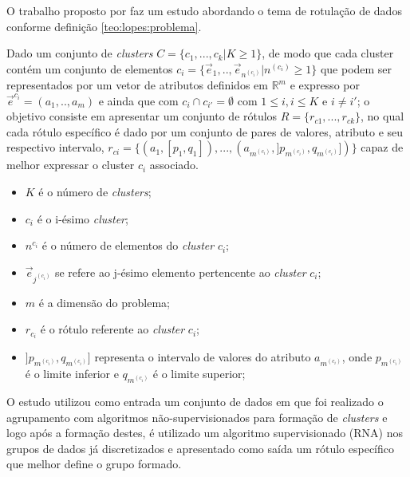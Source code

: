 O trabalho proposto por  faz um estudo abordando o tema de rotulação de dados conforme definição  \ref{teo:lopes:problema}.
% 
    \begin{teorema}
Dado um conjunto de \textit{clusters} ${C=\{c_1,...,c_k | K \geqslant 1\} }$, de modo que cada cluster contém um conjunto de elementos ${c_i=\{\vec{e}_1,..,\vec{e}_{n^{(c_i)}}|n^{(c_i)} \geqslant 1 \}}$ que podem ser representados por um vetor de atributos definidos em ${\mathbb{R}^m }$ e expresso por ${ \vec{e}^{c_i}=(a_1,..,a_m)  }$ e ainda que  com ${ c_i \cap c_{i'}=\emptyset }$ com ${ 1 \leqslant i, i \leqslant K  }$ e ${ i \neq i' }$; o objetivo consiste em apresentar um conjunto de rótulos ${ R=\{ r_{c1},...,r_{ck} \} }$, no qual cada rótulo específico é dado por um conjunto de pares de valores, atributo e seu respectivo intervalo, ${ r_{ci}=\{ (a_1,[p_1,q_1]),...,(a_{m^{(c_i)}}, ]p_{m^{(c_i)}},q_{m^{(c_i)}}]) \} }$ capaz de melhor expressar o cluster ${c_i}$ associado.
        \begin{itemize}[noitemsep]
            \item ${K}$ é o número de \textit{clusters};
            \item ${c_i}$ é o i-ésimo \textit{cluster};
            \item ${n^{c_i}}$ é o número de elementos do \textit{cluster} ${c_i}$;
            \item ${\vec{e}_{j^{(c_i)}}}$ se refere ao j-ésimo elemento pertencente ao \textit{cluster} ${c_i}$;
            \item ${m}$ é a dimensão do problema;
            \item ${r_{c_i}}$ é o rótulo referente ao \textit{cluster} ${c_i}$;
            \item ${]p_{m^{(c_i)}},q_{m^{(c_i)}}]}$ representa o intervalo de valores do atributo ${a_{m^{(c_i)}} }$, onde ${ p_{m^{(c_i)}} }$  é o limite inferior e ${ q_{m^{(c_i)}} }$ é o limite superior;
        \end{itemize}
    \label{teo:lopes:problema}
    \end{teorema}


O estudo utilizou como entrada um conjunto de dados em que foi realizado o agrupamento com algoritmos não-supervisionados para formação de \textit{clusters} e logo após a formação destes, é utilizado um algoritmo supervisionado (RNA) nos grupos de dados já discretizados e apresentado como saída um rótulo específico que melhor define o grupo formado. 

